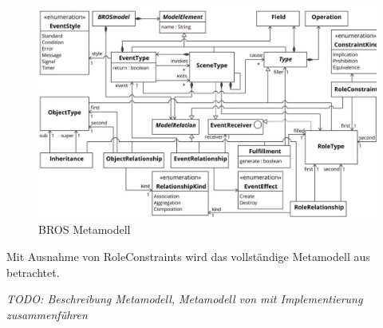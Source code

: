\begin{figure}
    \centering
    \includegraphics[width=\textwidth,keepaspectratio]{../images/brosMetamodell.jpg}%
    \caption{BROS Metamodell}%
    \label{fig:brosMetamodell}
\end{figure}

Mit Ausnahme von RoleConstraints wird das vollständige Metamodell aus \cite{Schoen} betrachtet.

\textit{TODO: Beschreibung Metamodell, Metamodell von \cite{Schoen} mit Implementierung zusammenführen}
